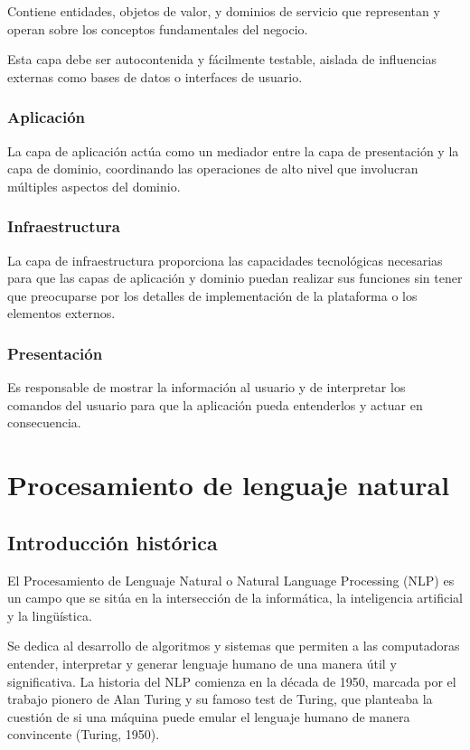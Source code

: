 Contiene entidades, objetos de valor, y dominios de servicio que representan y operan sobre los
conceptos fundamentales del negocio.

Esta capa debe ser autocontenida y fácilmente testable, aislada de influencias externas como bases de
datos o interfaces de usuario.

\subsubsection*{Aplicación}
La capa de aplicación actúa como un mediador entre la capa de presentación y la capa de dominio, coordinando
las operaciones de alto nivel que involucran múltiples aspectos del dominio.

\subsubsection*{Infraestructura}
La capa de infraestructura proporciona las capacidades tecnológicas necesarias para que las capas de
aplicación y dominio puedan realizar sus funciones sin tener que
preocuparse por los detalles de implementación de la plataforma o los elementos externos.

\subsubsection*{Presentación}
Es responsable de mostrar la información al usuario y de interpretar los
comandos del usuario para que la aplicación pueda entenderlos y actuar en consecuencia.



\section{Procesamiento de lenguaje natural}
\subsection*{Introducción histórica}
El Procesamiento de Lenguaje Natural o Natural Language Processing (NLP) es un campo que se sitúa en la
intersección de la informática, la inteligencia artificial y la lingüística.

Se dedica al desarrollo de algoritmos y sistemas que permiten a las computadoras entender, interpretar y generar
lenguaje humano de una manera útil y significativa. La historia del NLP comienza en la década de 1950, marcada
por el trabajo pionero de Alan Turing y su famoso
test de Turing, que planteaba la cuestión de si una máquina puede emular el lenguaje humano de manera convincente
(Turing, 1950).

